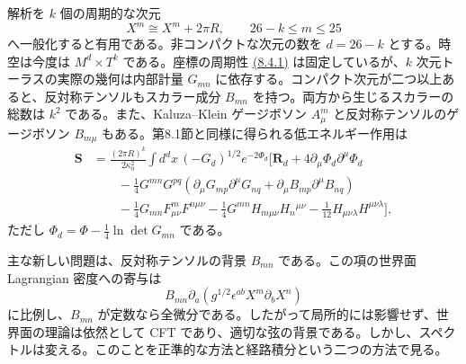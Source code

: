 解析を $k$ 個の周期的な次元
\begin{equation}
X^m\cong X^m+2\pi R,\qquad26-k\leq m\leq25
\tag{8.4.1}\label{eq:8.4.1}
\end{equation}
へ一般化すると有用である。非コンパクトな次元の数を $d=26-k$ とする。時空は今度は $M^d\times T^k$ である。座標の周期性 \hyperref[eq:8.4.1]{(8.4.1)} は固定しているが、$k$ 次元トーラスの実際の幾何は内部計量 $G_{mn}$ に依存する。コンパクト次元が二つ以上あると、反対称テンソルもスカラー成分 $B_{mn}$ を持つ。両方から生じるスカラーの総数は $k^2$ である。また、Kaluza--Klein ゲージボソン $A_\mu^m$ と反対称テンソルのゲージボソン $B_{m\mu}$ もある。第8.1節と同様に得られる低エネルギー作用は
\begin{equation}
\begin{aligned}
\bm S&=\frac{(2\pi R)^k}{2\kappa_0^2}\int d^dx\,(-G_d)^{1/2}e^{-2\Phi_d}
\biggl[\bm R_d+4\partial_\mu\Phi_d\partial^\mu\Phi_d\\
&\qquad-\frac14G^{mn}G^{pq}
(\partial_\mu G_{mp}\partial^\mu G_{nq}+\partial_\mu B_{mp}\partial^\mu B_{nq})\\
&\qquad-\frac14G_{mn}F_{\mu\nu}^mF^{n\mu\nu}
-\frac14G^{mn}H_{m\mu\nu}H_n{}^{\mu\nu}
-\frac1{12}H_{\mu\nu\lambda}H^{\mu\nu\lambda}\biggr],
\end{aligned}
\tag{8.4.2}\label{eq:8.4.2}
\end{equation}
ただし $\Phi_d=\Phi-\tfrac14\ln\det G_{mn}$ である。


主な新しい問題は、反対称テンソルの背景 $B_{mn}$ である。この項の世界面 Lagrangian 密度への寄与は
\begin{equation}
B_{mn}\partial_a(g^{1/2}\epsilon^{ab}X^m\partial_bX^n)
\tag{8.4.3}\label{eq:8.4.3}
\end{equation}
に比例し、$B_{mn}$ が定数なら全微分である。したがって局所的には影響せず、世界面の理論は依然として CFT であり、適切な弦の背景である。しかし、スペクトルは変える。このことを正準的な方法と経路積分という二つの方法で見る。

